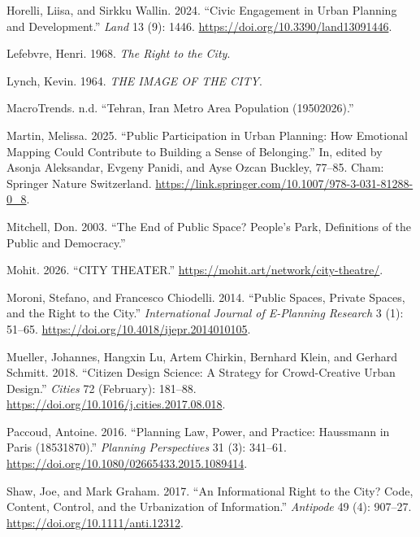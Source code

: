 \documentclass[
  letterpaper,
  DIV=11,
  numbers=noendperiod]{scrartcl}
\newlength{\cslhangindent}
\newenvironment{CSLReferences}[2] %
 {\begin{list}{}{%
  \setlength{\itemindent}{0pt}
  \setlength{\leftmargin}{0pt}
  \setlength{\parsep}{0pt}
  \ifodd #1
   \setlength{\leftmargin}{\cslhangindent}
   \setlength{\itemindent}{-1\cslhangindent}
  \fi
  \setlength{\itemsep}{#2\baselineskip}}}
 {\end{list}}
\begin{document}
\begin{CSLReferences}{1}{0}
Horelli, Liisa, and Sirkku Wallin. 2024. {``Civic Engagement in Urban
Planning and Development.''} \emph{Land} 13 (9): 1446.
\url{https://doi.org/10.3390/land13091446}.

Lefebvre, Henri. 1968. \emph{The Right to the City}.

Lynch, Kevin. 1964. \emph{THE IMAGE OF THE CITY}.

MacroTrends. n.d. {``Tehran, Iran Metro Area Population
(1950{\textendash}2026).''}

Martin, Melissa. 2025. {``Public Participation in Urban Planning: How
Emotional Mapping Could Contribute to Building a Sense of Belonging.''}
In, edited by Asonja Aleksandar, Evgeny Panidi, and Ayse Ozcan Buckley,
77--85. Cham: Springer Nature Switzerland.
\url{https://link.springer.com/10.1007/978-3-031-81288-0_8}.

Mitchell, Don. 2003. {``The End of Public Space? People's Park,
Definitions of the Public and Democracy.''}

Mohit. 2026. {``CITY THEATER.''}
\url{https://mohit.art/network/city-theatre/}.

Moroni, Stefano, and Francesco Chiodelli. 2014. {``Public Spaces,
Private Spaces, and the Right to the City.''} \emph{International
Journal of E-Planning Research} 3 (1): 51--65.
\url{https://doi.org/10.4018/ijepr.2014010105}.

Mueller, Johannes, Hangxin Lu, Artem Chirkin, Bernhard Klein, and
Gerhard Schmitt. 2018. {``Citizen Design Science: A Strategy for
Crowd-Creative Urban Design.''} \emph{Cities} 72 (February): 181--88.
\url{https://doi.org/10.1016/j.cities.2017.08.018}.

Paccoud, Antoine. 2016. {``Planning Law, Power, and Practice: Haussmann
in Paris (1853{\textendash}1870).''} \emph{Planning Perspectives} 31
(3): 341--61. \url{https://doi.org/10.1080/02665433.2015.1089414}.

Shaw, Joe, and Mark Graham. 2017. {``An Informational Right to the City?
Code, Content, Control, and the Urbanization of Information.''}
\emph{Antipode} 49 (4): 907--27.
\url{https://doi.org/10.1111/anti.12312}.


\end{CSLReferences}
\end{document}
